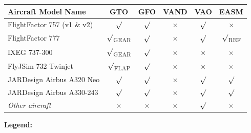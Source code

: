 \documentclass[a4paper,12pt]{article}
\begin{document}
\begin{center}
\begin{tabular}{|p{6cm}|c|c|c|c|c|}

\hline

\rowcolor{tablehdrcolor}
\textbf{Aircraft Model Name} & \textbf{GTO} & \textbf{GFO} & \textbf{VAND} &
\textbf{VAO} & \textbf{EASM} \\

\hline

FlightFactor 757 (v1 \& v2) & $\surd$ & $\surd$ & $\times$ & $\surd$ &
$\times$ \\

\hline

FlightFactor 777 & $\surd$\textsubscript{GEAR} & $\surd$ & $\times$ &
$\surd$ & $\surd$\textsubscript{REF} \\

\hline

IXEG 737-300 & $\surd$\textsubscript{GEAR} & $\surd$ & $\times$ &
$\times$ & $\times$ \\

\hline

FlyJSim 732 Twinjet & $\surd$\textsubscript{FLAP} & $\surd$ & $\times$ &
$\times$ & $\times$ \\

\hline

JARDesign Airbus A320 Neo & $\surd$ & $\surd$ & $\times$ & $\surd$ & $\surd$ \\

\hline

JARDesign Airbus A330-243 & $\surd$ & $\surd$ & $\times$ & $\surd$ & $\surd$ \\

\hline

\emph{Other aircraft} & $\times$ & $\times$ & $\times$ & $\surd$ & $\times$ \\

\hline

\end{tabular}
\end{center}

\noindent\textbf{\large Legend:}\vspace{0.5em}
\end{document}
